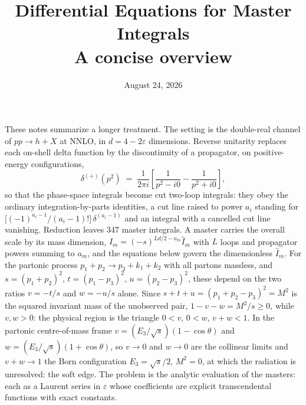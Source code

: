 \documentclass[11pt]{article}
\title{Differential Equations for Master Integrals\\[0.4ex]
\large A concise overview}
\date{August 24, 2026}
\newcommand{\eps}{\varepsilon}
\begin{document}
\maketitle

\noindent
These notes summarize a longer treatment.  The setting is the
double-real channel of $pp \to h + X$ at NNLO, in $d = 4-2\eps$
dimensions.  Reverse unitarity replaces each on-shell delta function
by the discontinuity of a propagator, on positive-energy
configurations,
\begin{equation}
  \delta^{(+)}(p^2) \;=\; \frac{1}{2\pi i}
  \left[\frac{1}{p^2-i0} - \frac{1}{p^2+i0}\right] ,
\end{equation}
so that the phase-space integrals become cut two-loop integrals: they
obey the ordinary integration-by-parts identities, a cut line raised
to power $a_i$ standing for
$\big[(-1)^{a_i-1}/(a_i-1)!\big]\,\delta^{(a_i-1)}$ and an integral
with a cancelled cut line vanishing.  Reduction leaves $347$ master
integrals.  A master carries the overall scale by its mass dimension,
$I_m = (-s)^{Ld/2-a_m}\hat I_m$ with $L$ loops and propagator powers
summing to $a_m$, and the equations below govern the dimensionless
$\hat I_m$.  For the partonic process
$p_1 + p_2 \to p_3 + k_1 + k_2$ with all partons massless, and
$s = (p_1+p_2)^2$, $t = (p_1-p_3)^2$, $u = (p_2-p_3)^2$, these depend
on the two ratios $v = -t/s$ and $w = -u/s$ alone.  Since
$s+t+u = (p_1+p_2-p_3)^2 = M^2$ is the squared invariant mass of the
unobserved pair, $1-v-w = M^2/s \ge 0$, while $v, w > 0$: the
physical region is the triangle $0<v$, $0<w$, $v+w<1$.  In the
partonic centre-of-mass frame
$v = (E_3/\sqrt s)(1-\cos\theta)$ and
$w = (E_3/\sqrt s)(1+\cos\theta)$, so $v \to 0$ and $w \to 0$ are the
collinear limits and $v+w \to 1$ the Born configuration
$E_3 = \sqrt s/2$, $M^2 = 0$, at which the radiation is unresolved:
the soft edge.  The problem is the analytic evaluation of the
masters: each as a Laurent series in $\eps$ whose coefficients are
explicit transcendental functions with exact constants.
\end{document}
